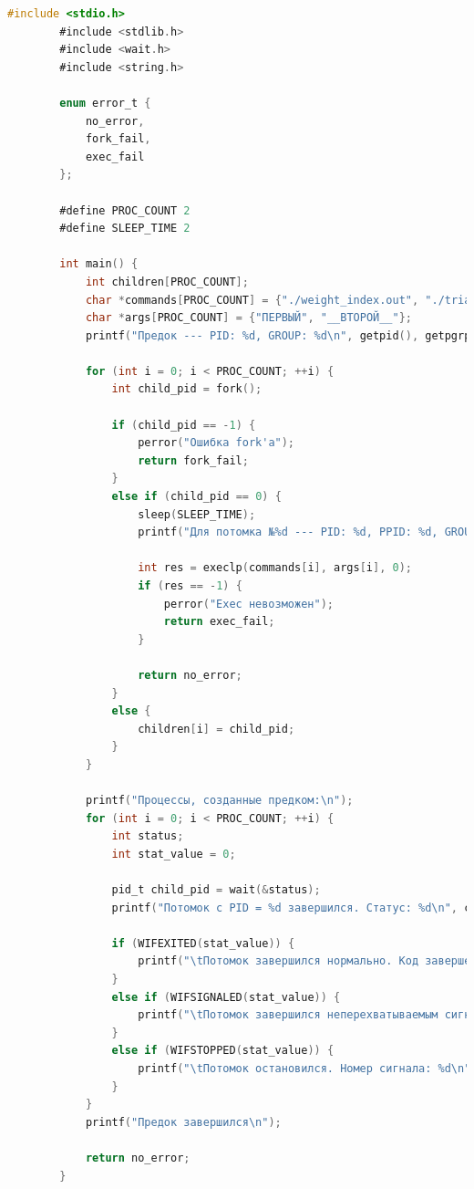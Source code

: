 \documentclass[12pt]{report}
\begin{document}
	\begin{lstlisting}[label=code:exec, caption=exec(), language=C]
		#include <stdio.h>
		#include <stdlib.h>
		#include <wait.h>
		#include <string.h>
		
		enum error_t {
			no_error,
			fork_fail,
			exec_fail
		};
		
		#define PROC_COUNT 2
		#define SLEEP_TIME 2
		
		int main() {
			int children[PROC_COUNT];
			char *commands[PROC_COUNT] = {"./weight_index.out", "./triangle_type.out"};
			char *args[PROC_COUNT] = {"ПЕРВЫЙ", "__ВТОРОЙ__"};
			printf("Предок --- PID: %d, GROUP: %d\n", getpid(), getpgrp());
			
			for (int i = 0; i < PROC_COUNT; ++i) {
				int child_pid = fork();
				
				if (child_pid == -1) {
					perror("Ошибка fork'а");
					return fork_fail;
				}
				else if (child_pid == 0) {
					sleep(SLEEP_TIME);
					printf("Для потомка №%d --- PID: %d, PPID: %d, GROUP: %d\n", i + 1, getpid(), getppid(), getpgrp());
					
					int res = execlp(commands[i], args[i], 0);
					if (res == -1) {
						perror("Exec невозможен");
						return exec_fail;
					}
					
					return no_error;
				}
				else {
					children[i] = child_pid;
				}
			}
			
			printf("Процессы, созданные предком:\n");
			for (int i = 0; i < PROC_COUNT; ++i) {
				int status;
				int stat_value = 0;
				
				pid_t child_pid = wait(&status);
				printf("Потомок с PID = %d завершился. Статус: %d\n", children[i], status);
				
				if (WIFEXITED(stat_value)) {
					printf("\tПотомок завершился нормально. Код завершения: %d\n", WEXITSTATUS(stat_value));
				}
				else if (WIFSIGNALED(stat_value)) {
					printf("\tПотомок завершился неперехватываемым сигналом. Номер сигнала: %d\n", WTERMSIG(stat_value));
				}
				else if (WIFSTOPPED(stat_value)) {
					printf("\tПотомок остановился. Номер сигнала: %d\n", WSTOPSIG(stat_value));
				}
			}
			printf("Предок завершился\n");
			
			return no_error;
		}
	\end{lstlisting}
\end{document}
